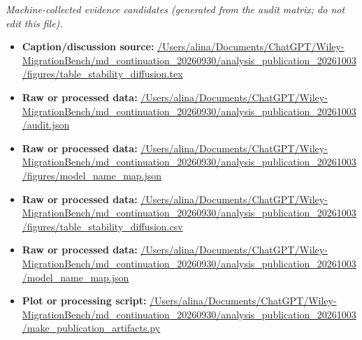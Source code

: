 \emph{Machine-collected evidence candidates (generated from the audit matrix; do not edit this file).}
\begin{itemize}[leftmargin=1.4em,noitemsep]
\item \textbf{Caption/discussion source:} \url{/Users/alina/Documents/ChatGPT/Wiley-MigrationBench/md_continuation_20260930/analysis_publication_20261003/figures/table_stability_diffusion.tex}
\item \textbf{Raw or processed data:} \url{/Users/alina/Documents/ChatGPT/Wiley-MigrationBench/md_continuation_20260930/analysis_publication_20261003/audit.json}
\item \textbf{Raw or processed data:} \url{/Users/alina/Documents/ChatGPT/Wiley-MigrationBench/md_continuation_20260930/analysis_publication_20261003/figures/model_name_map.json}
\item \textbf{Raw or processed data:} \url{/Users/alina/Documents/ChatGPT/Wiley-MigrationBench/md_continuation_20260930/analysis_publication_20261003/figures/table_stability_diffusion.csv}
\item \textbf{Raw or processed data:} \url{/Users/alina/Documents/ChatGPT/Wiley-MigrationBench/md_continuation_20260930/analysis_publication_20261003/model_name_map.json}
\item \textbf{Plot or processing script:} \url{/Users/alina/Documents/ChatGPT/Wiley-MigrationBench/md_continuation_20260930/analysis_publication_20261003/make_publication_artifacts.py}
\end{itemize}
